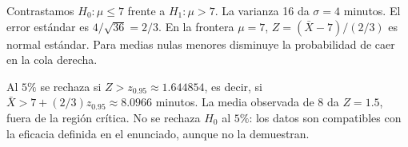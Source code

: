 Contrastamos $H_0:\mu\le7$ frente a $H_1:\mu>7$.
La varianza 16 da $\sigma=4$ minutos. El error estándar
es $4/\sqrt{36}=2/3$. En la frontera $\mu=7$,
$Z=(\bar X-7)/(2/3)$ es normal estándar. Para medias
nulas menores disminuye la probabilidad de caer en la cola derecha.

Al $5\%$ se rechaza si $Z>z_{0.95}\approx1.644854$,
es decir, si $\bar X>7+(2/3)z_{0.95}\approx8.0966$ minutos.
La media observada de 8 da $Z=1.5$, fuera de la región crítica.
No se rechaza $H_0$ al $5\%$: los datos son compatibles con
la eficacia definida en el enunciado, aunque no la demuestran.
